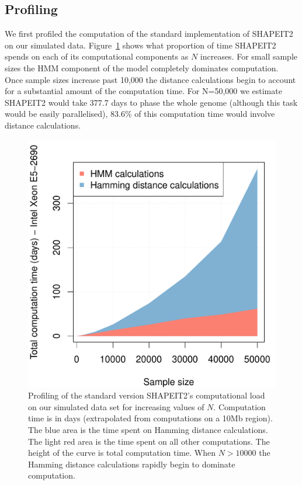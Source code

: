 \subsection{Profiling}
We first profiled the computation of the standard implementation of SHAPEIT2 on our simulated data.  Figure~\ref{chap5:s2-profile} shows what proportion of time SHAPEIT2 spends on each of its computational components as $N$ increases.  For small sample sizes the HMM component of the model completely dominates computation.  Once sample sizes increase past 10,000 the distance calculations begin to account for a substantial amount of the computation time.  For N=50,000 we estimate SHAPEIT2 would take 377.7 days to phase the whole genome (although this task would be easily parallelised), 83.6\% of this computation time would involve distance calculations.  
\begin{figure}
  \centering
  \includegraphics[width=.5\textwidth]{chap5figs/shapeit2_profiling}
  \caption[SHAPEIT computation profiling]{Profiling of the standard version SHAPEIT2's computational load on our simulated data set for increasing values of $N$. Computation time is in days (extrapolated from computations on a 10Mb region).  The blue area is the time spent on Hamming distance calculations. The light red area is the time spent on all other computations. The height of the curve is total computation time. When $N>10000$ the Hamming distance calculations rapidly begin to dominate computation. \label{chap5:s2-profile}}
\end{figure}

